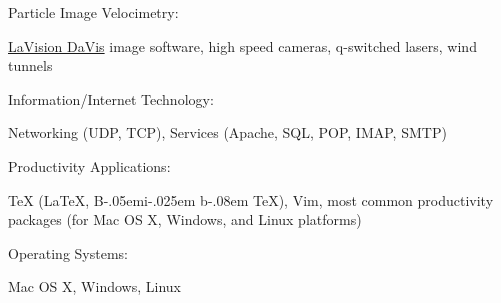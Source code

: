 \documentclass[11pt]{article}
\renewcommand{\section}[1]{\pagebreak[3]%
    \vspace{1.3\baselineskip}%
    \phantomsection\addcontentsline{toc}{section}{#1}%
    \noindent\llap{\scshape\smash{\parbox[t]{\marginparwidth}{\hyphenpenalty=10000\raggedright #1}}}%
    \vspace{-\baselineskip}\par}
\newcommand{\blankline}{\quad\pagebreak[3]}
\newcommand{\halfblankline}{\quad\vspace{-0.5\baselineskip}\pagebreak[3]}
\providecommand\BibTeX{{B\kern-.05em{\sc i\kern-.025em b}\kern-.08em
    \TeX}}
\begin{document}
\blankline


Particle Image Velocimetry:
\begin{innerlist}
    \item \href{http://www.lavision.de/en/products/davis.php}{LaVision DaVis} image software, high speed cameras, q-switched lasers, wind tunnels
\end{innerlist}


\blankline


Information/Internet Technology:
\begin{innerlist}
    \item Networking (UDP, TCP), Services (Apache, SQL, POP, IMAP, SMTP) 
\end{innerlist}


\blankline


Productivity Applications:
\begin{innerlist}
    \item \TeX{} (\LaTeX{}, \BibTeX{}), Vim, most common productivity packages (for Mac OS X, Windows, and Linux platforms)
\end{innerlist}


\blankline


Operating Systems:
\begin{innerlist}
    \item Mac OS X, Windows, Linux 
\end{innerlist}










\end{document}
